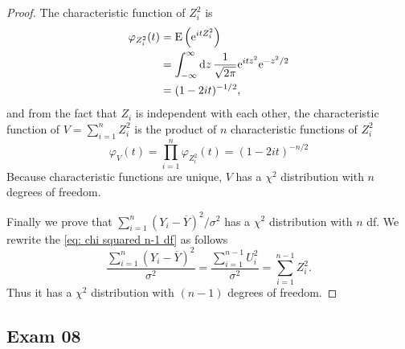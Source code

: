 \documentclass[10pt]{article}
\begin{document}
\begin{enumerate}
\begin{proof}
			The characteristic function of $Z_i^2$ is
			\begin{align*}
				\varphi_{Z_i^2}(t) &= \operatorname{E}\qty({\mathrm{e}}^{it Z_i^2}) \\
				&= \int_{-\infty}^{\infty} \dd{z} \frac{1}{\sqrt{2\pi}} {\mathrm{e}}^{it z^2} {\mathrm{e}}^{-z^2/2} \\
				&= (1 - 2it)^{-1/2},
			\end{align*}
			and from the fact that $Z_i$ is independent with each other, the characteristic function of $V = \sum_{i = 1}^n Z_i^2$ is the product of $n$ characteristic functions of $Z_i^2$
			\begin{equation}
				\varphi_{V}(t) = \prod_{i=1}^n \varphi_{Z_i^2}(t) = (1 - 2it)^{-n/2}
			\end{equation}
			Because characteristic functions are unique, $V$ has a $\chi^2$ distribution with $n$ degrees of freedom.

			Finally we prove that $\sum_{i=1}^n (Y_i - \overline{Y})^2/\sigma^2$ has a $\chi^2$ distribution with $n$ df. We rewrite the \eqref{eq: chi squared n-1 df} as follows
			\begin{equation}
				\frac{\sum_{i=1}^n (Y_i - \overline{Y})^2}{\sigma^2} = \frac{\sum_{i=1}^{n-1} U_i^2}{\sigma^2} = \sum_{i=1}^{n-1} Z_i^2.
			\end{equation}
			Thus it has a $\chi^2$ distribution with $(n-1)$ degrees of freedom.
		\end{proof}
	\end{enumerate}

	\subsection{Exam 08}
\end{document}
